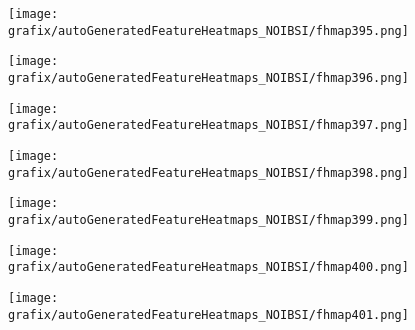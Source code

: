\begin{subfigure}{\wid\textwidth} 
    \centering 
    \caption{\tiny \sffamily {}} 
    \vspace{\vsp} 
    \texttt{[image: grafix/autoGeneratedFeatureHeatmaps\_NOIBSI/fhmap395.png]} 
\end{subfigure} 
\hspace{\hsp} 
\begin{subfigure}{\wid\textwidth} 
    \centering 
    \caption{\tiny \sffamily {}} 
    \vspace{\vsp} 
    \texttt{[image: grafix/autoGeneratedFeatureHeatmaps\_NOIBSI/fhmap396.png]} 
\end{subfigure} 
\hspace{\hsp} 
\begin{subfigure}{\wid\textwidth} 
    \centering 
    \caption{\tiny \sffamily {}} 
    \vspace{\vsp} 
    \texttt{[image: grafix/autoGeneratedFeatureHeatmaps\_NOIBSI/fhmap397.png]} 
\end{subfigure} 
\hspace{\hsp} 
\begin{subfigure}{\wid\textwidth} 
    \centering 
    \caption{\tiny \sffamily {}} 
    \vspace{\vsp} 
    \texttt{[image: grafix/autoGeneratedFeatureHeatmaps\_NOIBSI/fhmap398.png]} 
\end{subfigure} 
\hspace{\hsp} 
\begin{subfigure}{\wid\textwidth} 
    \centering 
    \caption{\tiny \sffamily {}} 
    \vspace{\vsp} 
    \texttt{[image: grafix/autoGeneratedFeatureHeatmaps\_NOIBSI/fhmap399.png]} 
\end{subfigure} 
\hspace{\hsp} 
\begin{subfigure}{\wid\textwidth} 
    \centering 
    \caption{\tiny \sffamily {}} 
    \vspace{\vsp} 
    \texttt{[image: grafix/autoGeneratedFeatureHeatmaps\_NOIBSI/fhmap400.png]} 
\end{subfigure} 
\hspace{\hsp} 
\begin{subfigure}{\wid\textwidth} 
    \centering 
    \caption{\tiny \sffamily {}} 
    \vspace{\vsp} 
    \texttt{[image: grafix/autoGeneratedFeatureHeatmaps\_NOIBSI/fhmap401.png]} 
\end{subfigure} 
